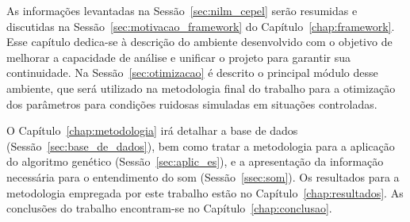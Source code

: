 As informações levantadas na Sessão~\ref{sec:nilm_cepel} serão
resumidas e discutidas na Sessão~\ref{sec:motivacao_framework} do
Capítulo~\ref{chap:framework}. Esse capítulo dedica-se à descrição do
ambiente desenvolvido com o objetivo de melhorar a capacidade de
análise e unificar o projeto para garantir sua continuidade. Na
Sessão~\ref{sec:otimizacao} é descrito o principal módulo desse
ambiente, que será utilizado na metodologia final do trabalho para a
otimização dos parâmetros para condições ruidosas simuladas em
situações controladas.

O Capítulo~\ref{chap:metodologia} irá detalhar a base de dados
(Sessão~\ref{sec:base_de_dados}), bem como tratar a metodologia para a
aplicação do algoritmo genético (Sessão~\ref{sec:aplic_es}), e a
apresentação da informação necessária para o entendimento do \acs{som}
(Sessão~\ref{ssec:som}). Os resultados para a metodologia empregada
por este trabalho estão no Capítulo~\ref{chap:resultados}. As
conclusões do trabalho encontram-se no Capítulo~\ref{chap:conclusao}.

\glsunsetall

